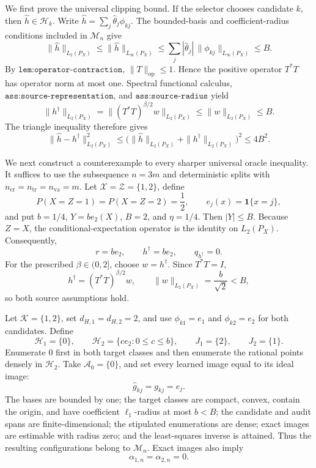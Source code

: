 We first prove the universal clipping bound. If the selector chooses candidate \(k\), then \(\widehat h\in\mathcal H_k\). Write \(\widehat h=\sum_j\widehat\theta_j\phi_{kj}\). The bounded-basis and coefficient-radius conditions included in \(\mathcal M_n\) give
\[
 \|\widehat h\|_{L_2(P_X)}
 \le\|\widehat h\|_{L_\infty(P_X)}
 \le\sum_j|\widehat\theta_j|\,\|\phi_{kj}\|_{L_\infty(P_X)}
 \le B.
\]
By \(\texttt{lem:operator-contraction}\), \(\|T\|_{\mathrm{op}}\le1\). Hence the positive operator \(T^*T\) has operator norm at most one. Spectral functional calculus, \(\texttt{ass:source-representation}\), and \(\texttt{ass:source-radius}\) yield
\[
 \|h^\dagger\|_{L_2(P_X)}
 =\|(T^*T)^{\beta/2}w\|_{L_2(P_X)}
 \le\|w\|_{L_2(P_X)}
 \le B.
\]
The triangle inequality therefore gives
\[
 \|\widehat h-h^\dagger\|_{L_2(P_X)}^2
 \le\bigl(\|\widehat h\|_{L_2(P_X)}+\|h^\dagger\|_{L_2(P_X)}\bigr)^2
 \le4B^2.
\]

We next construct a counterexample to every sharper universal oracle inequality. It suffices to use the subsequence \(n=3m\) and deterministic splits with \(n_{\mathrm{cr}}=n_{\mathrm{tr}}=n_{\mathrm{va}}=m\). Let \(\mathcal X=\mathcal Z=\{1,2\}\), define
\[
 P(X=Z=1)=P(X=Z=2)=\frac12,
 \qquad
 e_j(x)=\mathbf 1\{x=j\},
\]
and put \(b=1/4\), \(Y=b e_2(X)\), \(B=2\), and \(\eta=1/4\). Then \(|Y|\le B\). Because \(Z=X\), the conditional-expectation operator is the identity on \(L_2(P_X)\). Consequently,
\[
 r=b e_2,
 \qquad
 h^\dagger=b e_2,
 \qquad
 q_{h^\dagger}=0.
\]
For the prescribed \(\beta\in(0,2]\), choose \(w=h^\dagger\). Since \(T^*T=I\),
\[
 h^\dagger=(T^*T)^{\beta/2}w,
 \qquad
 \|w\|_{L_2(P_X)}=\frac{b}{\sqrt2}<B,
\]
so both source assumptions hold.

Let \(\mathcal K=\{1,2\}\), set \(d_{H,1}=d_{H,2}=2\), and use \(\phi_{k1}=e_1\) and \(\phi_{k2}=e_2\) for both candidates. Define
\[
 \mathcal H_1=\{0\},
 \qquad
 \mathcal H_2=\{c e_2:0\le c\le b\},
 \qquad
 J_1=\{2\},
 \qquad
 J_2=\{1\}.
\]
Enumerate \(0\) first in both target classes and then enumerate the rational points densely in \(\mathcal H_2\). Take \(\mathcal A_0=\{0\}\), and set every learned image equal to its ideal image:
\[
 \widehat g_{kj}=g_{kj}=e_j.
\]
The bases are bounded by one; the target classes are compact, convex, contain the origin, and have coefficient \(\ell_1\)-radius at most \(b<B\); the candidate and audit spans are finite-dimensional; the stipulated enumerations are dense; exact images are estimable with radius zero; and the least-squares inverse is attained. Thus the resulting configurations belong to \(\mathcal M_n\). Exact images also imply
\[
 \alpha_{1,n}=\alpha_{2,n}=0.
\]

